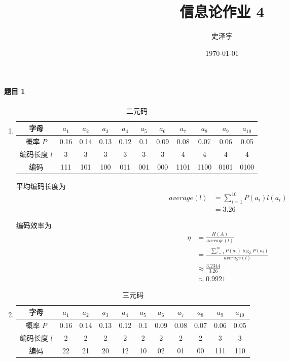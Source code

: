 \documentclass{ctexart}
\title{信息论作业 4}
\author{史泽宇}
\date{\today}
\begin{document}
\maketitle

\paragraph{题目 1}

\begin{enumerate}
    \item\begin{table}[H]
        \centering
        \caption{二元码}
        \begin{tabular}{c|c|c|c|c|c|c|c|c|c|c}
            \hline
            字母 & $a_1$ & $a_2$ & $a_3$ & $a_4$ & $a_5$ & $a_6$ & $a_7$ & $a_8$ & $a_9$ & $a_{10}$ \\
            \hline
            概率 $P$ & 0.16 & 0.14 & 0.13 & 0.12 & 0.1 & 0.09 & 0.08 & 0.07 & 0.06 & 0.05 \\
            编码长度 $l$ & 3 & 3 & 3 & 3 & 3 & 3 & 4 & 4 & 4 & 4 \\
            编码 & 111 & 101 & 100 & 011 & 001 & 000 & 1101 & 1100 & 0101 & 0100 \\
            \hline
        \end{tabular}
    \end{table}

    平均编码长度为
    \begin{align}
        average(l) &= \sum_{i=1}^{10} P(a_i)l(a_i) \\
        &= 3.26
    \end{align}

    编码效率为
    \begin{align}
        \eta &= \frac{H(A)}{average(l)} \\
        &= \frac{-\sum_{i=1}^{10} P(a_i)\log_2 P(a_i)}{average(l)} \\
        &\approx \frac{3.2344}{3.26} \\
        &\approx 0.9921
    \end{align}

    \item\begin{table}[H]
        \centering
        \caption{三元码}
        \begin{tabular}{c|c|c|c|c|c|c|c|c|c|c}
            \hline
            字母 & $a_1$ & $a_2$ & $a_3$ & $a_4$ & $a_5$ & $a_6$ & $a_7$ & $a_8$ & $a_9$ & $a_{10}$ \\
            \hline
            概率 $P$ & 0.16 & 0.14 & 0.13 & 0.12 & 0.1 & 0.09 & 0.08 & 0.07 & 0.06 & 0.05 \\
            编码长度 $l$ & 2 & 2 & 2 & 2 & 2 & 2 & 2 & 2 & 3 & 3 \\
            编码 & 22 & 21 & 20 & 12 & 10 & 02 & 01 & 00 & 111 & 110 \\
            \hline
        \end{tabular}
    \end{table}


\end{enumerate}
\end{document}

